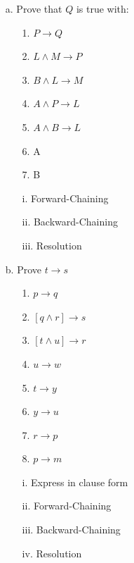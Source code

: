 \documentclass[11pt]{article}
\begin{document}
\begin{flushleft}
\begin{enumerate}

    \item[a.] Prove that $Q$ is true with:

        \begin{enumerate}
            \item[1.] $P \rightarrow Q$
            \item[2.] $L \land M \rightarrow P$
            \item[3.] $B \land L \rightarrow M$
            \item[4.] $A \land P \rightarrow L$
            \item[5.] $A \land B \rightarrow L$
            \item[6.] A
            \item[7.] B
        \end{enumerate}

        \begin{enumerate}
            \item[i.] Forward-Chaining
            \item[ii.] Backward-Chaining
            \item[iii.] Resolution
        \end{enumerate}

    \item[b.] Prove $t \rightarrow s$

        \begin{enumerate}
            \item[1.] $p \rightarrow q$
            \item[2.] $[q \land r] \rightarrow s$
            \item[3.] $[t \land u] \rightarrow r$
            \item[4.] $u \rightarrow w$
            \item[5.] $t \rightarrow y$
            \item[6.] $y \rightarrow u$
            \item[7.] $r \rightarrow p$
            \item[8.] $p \rightarrow m$
        \end{enumerate}

        \begin{enumerate}
            \item[i.] Express in clause form
            \item[ii.] Forward-Chaining
            \item[iii.] Backward-Chaining
            \item[iv.] Resolution
        \end{enumerate}


\end{enumerate}
\end{flushleft}
\end{document}
